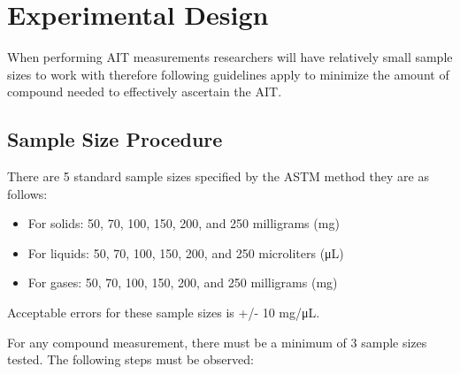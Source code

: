 \hypertarget{experimental-design}{%
\section{Experimental Design}\label{experimental-design}}

When performing AIT measurements researchers will have relatively small
sample sizes to work with therefore following guidelines apply to
minimize the amount of compound needed to effectively ascertain the AIT.

\hypertarget{sample-size-procedure}{%
\subsection{Sample Size Procedure}\label{sample-size-procedure}}

There are 5 standard sample sizes specified by the ASTM method they are
as follows:

\begin{itemize}
\tightlist
\item
  For solids: 50, 70, 100, 150, 200, and 250 milligrams (mg)
\item
  For liquids: 50, 70, 100, 150, 200, and 250 microliters (μL)
\item
  For gases: 50, 70, 100, 150, 200, and 250 milligrams (mg)
\end{itemize}

Acceptable errors for these sample sizes is +/- 10 mg/μL.

For any compound measurement, there must be a minimum of 3 sample sizes
tested. The following steps must be observed:

